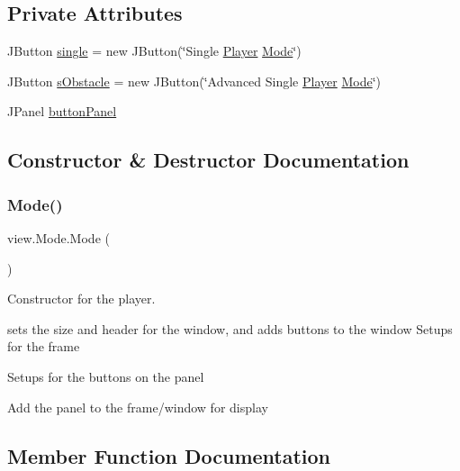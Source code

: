 \subsection*{Private Attributes}
\begin{DoxyCompactItemize}
\item 
J\+Button \hyperlink{classview_1_1_mode_a79eea473b39369327297c8788dd071c2}{single} = new J\+Button(\char`\"{}Single \hyperlink{classmodel_1_1_player}{Player} \hyperlink{classview_1_1_mode}{Mode}\char`\"{})
\item 
J\+Button \hyperlink{classview_1_1_mode_a015d017e7fa759ee77d191c4d03ee531}{s\+Obstacle} = new J\+Button(\char`\"{}Advanced Single \hyperlink{classmodel_1_1_player}{Player} \hyperlink{classview_1_1_mode}{Mode}\char`\"{})
\item 
J\+Panel \hyperlink{classview_1_1_mode_ab457e88b13dca6e72659a05f9d6d7853}{button\+Panel}
\end{DoxyCompactItemize}


\subsection{Constructor \& Destructor Documentation}
\hypertarget{classview_1_1_mode_a55b668b8551b43596ab48afb749faec0}{}\label{classview_1_1_mode_a55b668b8551b43596ab48afb749faec0} 
\subsubsection{\texorpdfstring{Mode()}{Mode()}}
{\footnotesize\ttfamily view.\+Mode.\+Mode (\begin{DoxyParamCaption}{ }\end{DoxyParamCaption})}



Constructor for the player. 

sets the size and header for the window, and adds buttons to the window Setups for the frame

Setups for the buttons on the panel

Add the panel to the frame/window for display

\subsection{Member Function Documentation}
\hypertarget{classview_1_1_mode_a133b1b524c5ac2bb62da0f7f892c006d}{}\label{classview_1_1_mode_a133b1b524c5ac2bb62da0f7f892c006d} 
